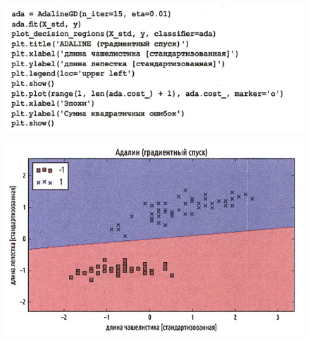 \documentclass{beamer}
\begin{document}
\begin{frame}[t]
\begin{figure}[h]
\centering
\includegraphics[scale=0.6]{images/lec03-pic30.png}
\end{figure}
\begin{figure}[h]
\centering
\includegraphics[scale=0.4]{images/lec03-pic31.png}
\end{figure}
\end{frame}
\end{document}
